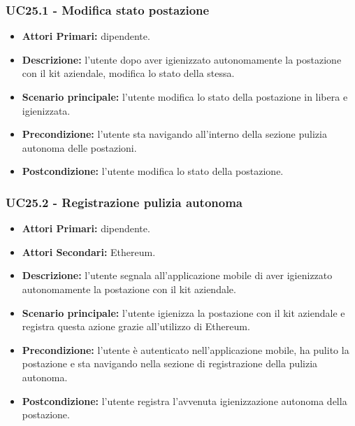 \subsubsection{ UC25.1 - Modifica stato postazione }
\begin{itemize}
	\item\textbf{Attori Primari:} dipendente.
	\item\textbf{Descrizione:} l’utente dopo aver igienizzato autonomamente la postazione con il kit aziendale, modifica lo stato della stessa.
	\item\textbf{Scenario principale:} l’utente modifica lo stato della postazione in libera e igienizzata.
	\item\textbf{Precondizione:} l’utente sta navigando all'interno della sezione pulizia autonoma delle postazioni.
	\item\textbf{Postcondizione:} l’utente modifica lo stato della postazione.
\end{itemize}

\subsubsection{ UC25.2 - Registrazione pulizia autonoma }
\begin{itemize}
	\item\textbf{Attori Primari:} dipendente.
	\item\textbf{Attori Secondari:} Ethereum.
	\item\textbf{Descrizione:} l’utente segnala all'applicazione mobile di aver igienizzato autonomamente la postazione con il kit aziendale.
	\item\textbf{Scenario principale:} l’utente igienizza la postazione con il kit aziendale e registra questa azione grazie all'utilizzo di Ethereum.
	\item\textbf{Precondizione:} l’utente è autenticato nell'applicazione mobile, ha pulito la postazione e sta navigando nella sezione di 
	registrazione della pulizia autonoma.
	\item\textbf{Postcondizione:} l’utente registra l'avvenuta igienizzazione autonoma della postazione.
\end{itemize}
